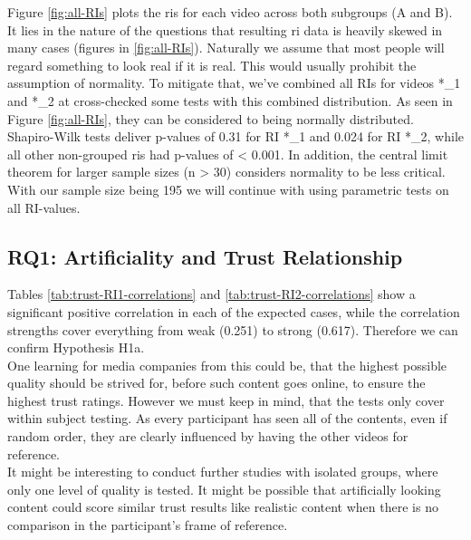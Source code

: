 \documentclass[
  a4paper,  %
  twoside,  %
  bibliography=totoc,
  headsepline,
  cleardoublepage=empty,
  parskip=half,
  draft=false
]{scrbook}
\begin{document}
 Figure \ref{fig:all-RIs} plots the \gls{ri}s for each video across both subgroups (A and B). \\
 It lies in the nature of the questions that resulting \gls{ri} data is heavily skewed in many cases (figures in \ref{fig:all-RIs}). Naturally we assume that most people will regard something to look real if it is real. This would usually prohibit the assumption of normality. To mitigate that, we've combined all RIs for videos *\_1 and *\_2 at cross-checked some tests with this combined distribution. As seen in Figure \ref{fig:all-RIs}, they can be considered to being normally distributed. Shapiro-Wilk tests deliver p-values of 0.31 for RI *\_1 and 0.024 for RI *\_2, while all other non-grouped \gls{ri}s had p-values of < 0.001. In addition, the central limit theorem for larger sample sizes (n > 30) considers normality to be less critical. With our sample size being 195 we will continue with using parametric tests on all RI-values.

\subsection{RQ1: Artificiality and Trust Relationship}
\label{subsec:RQ1}
Tables \ref{tab:trust-RI1-correlations} and \ref{tab:trust-RI2-correlations} show a significant positive correlation in each of the expected cases, while the correlation strengths cover everything from weak (0.251) to strong (0.617). Therefore we can confirm Hypothesis H1a. \\
One learning for media companies from this could be, that the highest possible quality should be strived for, before such content goes online, to ensure the highest trust ratings. However we must keep in mind, that the tests only cover within subject testing. As every participant has seen all of the contents, even if random order, they are clearly influenced by having the other videos for reference. \\
It might be interesting to conduct further studies with isolated groups, where only one level of quality is tested. It might be possible that artificially looking content could score similar trust results like realistic content when there is no comparison in the participant's frame of reference.
\end{document}
